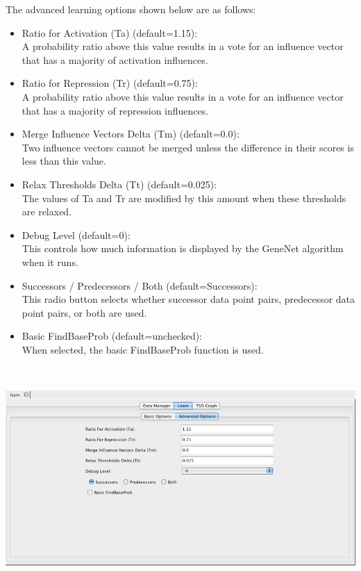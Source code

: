 \documentclass[titlepage,11pt]{article}
\begin{document}
The advanced learning options shown below are as follows:
\begin{itemize}
\item Ratio for Activation (Ta) (default=1.15): \\
A probability ratio above this value results in a vote for an
influence vector that has a majority of activation influences.
\item Ratio for Repression (Tr) (default=0.75): \\
A probability ratio above this value results in a vote for an
influence vector that has a majority of repression influences.
\item Merge Influence Vectors Delta (Tm) (default=0.0): \\
Two influence vectors cannot be merged unless the difference
in their scores is less than this value.
\item Relax Thresholds Delta (Tt) (default=0.025): \\
The values of Ta and Tr are modified by this amount when
these thresholds are relaxed.
\item Debug Level (default=0): \\
This controls how much information is displayed by the
GeneNet algorithm when it runs.
\item Successors / Predecessors / Both (default=Successors): \\
This radio button selects whether successor data point pairs,
predecessor data point pairs, or both are used.
\item Basic FindBaseProb (default=unchecked): \\
When selected, the basic FindBaseProb function is used.
\end{itemize}
\begin{center}
\includegraphics[height=85mm]{screenshots/advLearn}
\end{center}
\end{document}

